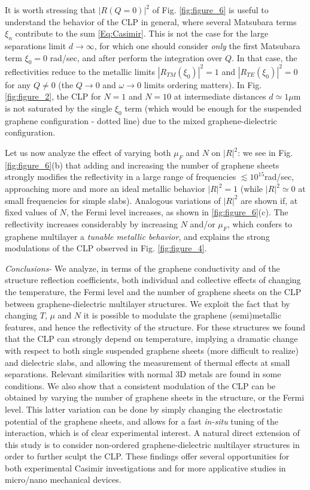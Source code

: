 \documentclass[aps,pra,superscriptaddress,amsmath,amssymb,showpacs,twocolumn,notitlepage]{revtex4-1}
\begin{document}
{It is worth stressing that $|R(Q=0)|^2$ of Fig. \ref{fig:figure_6} is useful to understand the behavior of the CLP in general, where several Matsubara terms $\xi_n$ contribute to the sum \eqref{Eq:Casimir}. This is not the case for the large separations limit $d\rightarrow \infty$, for which one should consider \emph{only} the first Matsubara term $\xi_0=0$ rad/sec, and after perform the integration over $Q$. In that case, the reflectivities  reduce to the metallic limits $|R_{TM}(\xi_0)|^2=1$ and $|R_{TE}(\xi_0)|^2=0$ for any $Q\neq0$ (the $Q\rightarrow 0$ and $\omega\rightarrow 0$ limits ordering matters). In Fig. \ref{fig:figure_2}, the CLP for $N=1$ and $N=10$ at intermediate distances $d\simeq 1\mu$m  is not saturated by the single $\xi_0$ term (which would be enough for the suspended graphene configuration - dotted line) due to the mixed graphene-dielectric configuration.}

Let us now analyze the effect of varying both $\mu_F$ and $N$ on $|R|^2$: we see in Fig. \ref{fig:figure_6}(b) that adding and increasing the number of graphene sheets strongly modifies the reflectivity in a large range of frequencies $\lesssim 10^{15}$rad/sec, approaching more and more {an ideal metallic behavior} $|R|^2=1$ (while $|R|^2\simeq 0$ at small frequencies for simple slabs). Analogous variations of $|R|^2$ are shown if, at fixed values of $N$, the Fermi level increases, as shown in \ref{fig:figure_6}(c). The reflectivity increases considerably by increasing $N$ and/or $\mu_F$, which confers to graphene multilayer a {\emph{tunable metallic behavior}}, and explains the strong modulations of the CLP observed in  Fig. \ref{fig:figure_4}. 



\emph{Conclusions-}
{We analyze, in terms of the graphene conductivity and of the structure reflection coefficients, both individual and collective effects of changing the temperature, the Fermi level and the number of graphene sheets on the CLP between graphene-dielectric multilayer structures. We exploit the fact that by changing $T$, $\mu$ and $N$ it is possible to modulate the graphene (semi)metallic features, and hence the reflectivity of the structure. For these structures we found that the CLP can strongly depend on temperature, implying a dramatic change with respect to both single suspended graphene sheets (more difficult to realize) and dielectric slabs, and allowing the measurement of thermal effects at small separations. Relevant similarities with normal 3D metals are found in some conditions.} We also show that a consistent modulation of the CLP can be obtained by varying the number of graphene sheets in the structure, or the Fermi level. This latter variation can be done by simply changing the electrostatic potential of the graphene sheets, and allows for a fast \emph{in-situ} tuning of the interaction, which is of clear experimental interest. A natural direct extension of this study is to consider non-ordered graphene-dielectric multilayer structures in order to further sculpt the CLP.  These findings offer several opportunities for both experimental Casimir investigations and for more applicative studies in micro/nano mechanical devices.
\end{document}
